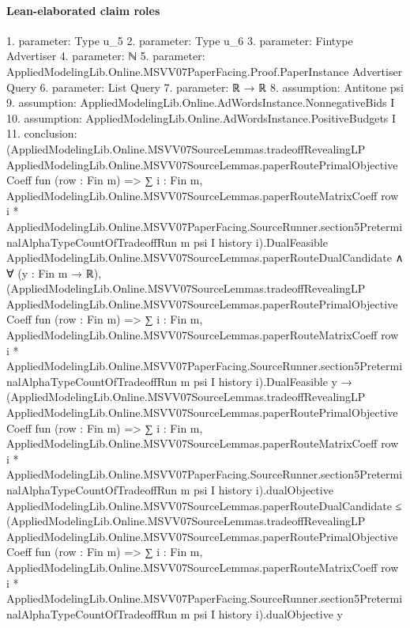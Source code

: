 \documentclass[10pt]{article}
\begin{document}
\paragraph{Lean-elaborated claim roles}\begin{ReviewVerbatim}
1. parameter: Type u_5
2. parameter: Type u_6
3. parameter: Fintype Advertiser
4. parameter: ℕ
5. parameter: AppliedModelingLib.Online.MSVV07PaperFacing.Proof.PaperInstance Advertiser Query
6. parameter: List Query
7. parameter: ℝ → ℝ
8. assumption: Antitone psi
9. assumption: AppliedModelingLib.Online.AdWordsInstance.NonnegativeBids I
10. assumption: AppliedModelingLib.Online.AdWordsInstance.PositiveBudgets I
11. conclusion: (AppliedModelingLib.Online.MSVV07SourceLemmas.tradeoffRevealingLP
        AppliedModelingLib.Online.MSVV07SourceLemmas.paperRoutePrimalObjectiveCoeff fun (row : Fin m) =>
        ∑ i : Fin m,
          AppliedModelingLib.Online.MSVV07SourceLemmas.paperRouteMatrixCoeff row i *
            AppliedModelingLib.Online.MSVV07PaperFacing.SourceRunner.section5PreterminalAlphaTypeCountOfTradeoffRun m
              psi I history i).DualFeasible
    AppliedModelingLib.Online.MSVV07SourceLemmas.paperRouteDualCandidate ∧
  ∀ (y : Fin m → ℝ),
    (AppliedModelingLib.Online.MSVV07SourceLemmas.tradeoffRevealingLP
            AppliedModelingLib.Online.MSVV07SourceLemmas.paperRoutePrimalObjectiveCoeff fun (row : Fin m) =>
            ∑ i : Fin m,
              AppliedModelingLib.Online.MSVV07SourceLemmas.paperRouteMatrixCoeff row i *
                AppliedModelingLib.Online.MSVV07PaperFacing.SourceRunner.section5PreterminalAlphaTypeCountOfTradeoffRun
                  m psi I history i).DualFeasible
        y →
      (AppliedModelingLib.Online.MSVV07SourceLemmas.tradeoffRevealingLP
              AppliedModelingLib.Online.MSVV07SourceLemmas.paperRoutePrimalObjectiveCoeff fun (row : Fin m) =>
              ∑ i : Fin m,
                AppliedModelingLib.Online.MSVV07SourceLemmas.paperRouteMatrixCoeff row i *
                  AppliedModelingLib.Online.MSVV07PaperFacing.SourceRunner.section5PreterminalAlphaTypeCountOfTradeoffRun
                    m psi I history i).dualObjective
          AppliedModelingLib.Online.MSVV07SourceLemmas.paperRouteDualCandidate ≤
        (AppliedModelingLib.Online.MSVV07SourceLemmas.tradeoffRevealingLP
              AppliedModelingLib.Online.MSVV07SourceLemmas.paperRoutePrimalObjectiveCoeff fun (row : Fin m) =>
              ∑ i : Fin m,
                AppliedModelingLib.Online.MSVV07SourceLemmas.paperRouteMatrixCoeff row i *
                  AppliedModelingLib.Online.MSVV07PaperFacing.SourceRunner.section5PreterminalAlphaTypeCountOfTradeoffRun
                    m psi I history i).dualObjective
          y
\end{ReviewVerbatim}
\end{document}
